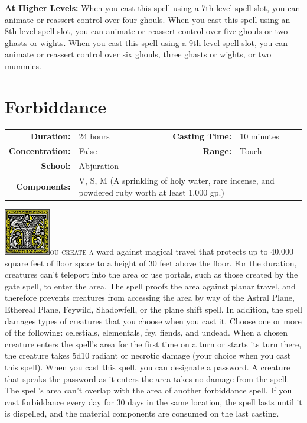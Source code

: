 \documentclass[12pt,showtrims]{memoir}
\begin{document}
\vspace{8pt} \noindent\textbf{At Higher Levels:} When you cast this spell using a 7th-level spell slot, you can animate or reassert control over four ghouls. When you cast this spell using an 8th-level spell slot, you can animate or reassert control over five ghouls or two ghasts or wights. When you cast this spell using a 9th-level spell slot, you can animate or reassert control over six ghouls, three ghasts or wights, or two mummies.
\newpage
\section*{Forbiddance}

{
\small\centering\vspace{-6pt}
\begin{tabular}{rlrl}
\toprule

\textbf{Duration:} & 24 hours &
\textbf{Casting Time:} & 10 minutes \\
\textbf{Concentration:} & False &
\textbf{Range:} & Touch \\
\textbf{School:} & Abjuration \\
\textbf{Components:} & \multicolumn{3}{p{0.7\textwidth}}{V, S, M (A sprinkling of holy water, rare incense, and powdered ruby worth at least 1,000 gp.)}\\

\bottomrule
\end{tabular}
}

\vspace{1\baselineskip}\noindent
\lettrine[lines=4]{\includegraphics[height=58pt]{initials/Y.png}}{ou create a} ward against magical travel that protects up to 40,000 square feet of floor space to a height of 30 feet above the floor. For the duration, creatures can't teleport into the area or use portals, such as those created by the gate spell, to enter the area. The spell proofs the area against planar travel, and therefore prevents creatures from accessing the area by way of the Astral Plane, Ethereal Plane, Feywild, Shadowfell, or the plane shift spell. In addition, the spell damages types of creatures that you choose when you cast it. Choose one or more of the following: celestials, elementals, fey, fiends, and undead. When a chosen creature enters the spell's area for the first time on a turn or starts its turn there, the creature takes 5d10 radiant or necrotic damage (your choice when you cast this spell). When you cast this spell, you can designate a password. A creature that speaks the password as it enters the area takes no damage from the spell. The spell's area can't overlap with the area of another forbiddance spell. If you cast forbiddance every day for 30 days in the same location, the spell lasts until it is dispelled, and the material components are consumed on the last casting.
\end{document}
